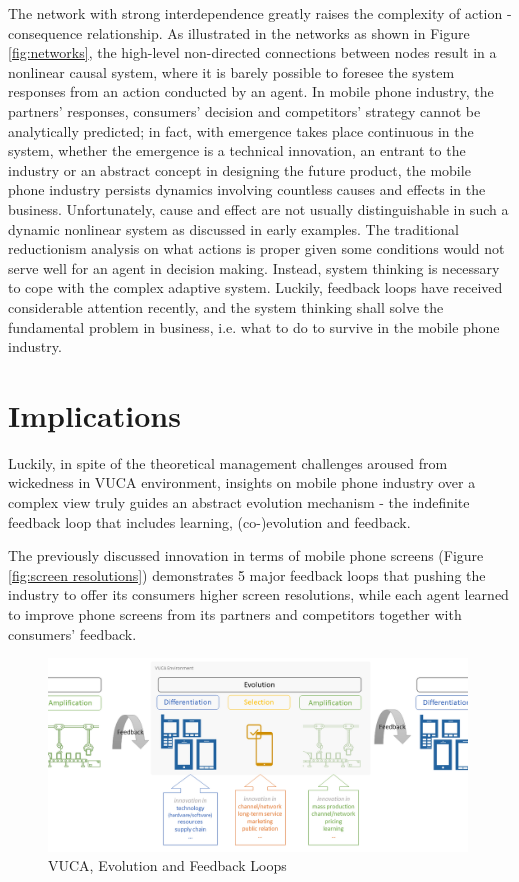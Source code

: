 \documentclass[utf8,english]{gradu3}
\begin{document}
The network with strong interdependence greatly raises the complexity of action - consequence relationship. As illustrated in the networks as shown in Figure \ref{fig:networks}, the high-level non-directed connections between nodes result in a nonlinear causal system, where it is barely possible to foresee the system responses from an action conducted by an agent. In mobile phone industry, the partners' responses, consumers' decision and competitors' strategy cannot be analytically predicted; in fact, with emergence takes place continuous in the system, whether the emergence is a technical innovation, an entrant to the industry or an abstract concept in designing the future product, the mobile phone industry persists dynamics involving countless causes and effects in the business. Unfortunately, cause and effect are not usually distinguishable in such a dynamic nonlinear system as discussed in early examples. The traditional reductionism analysis on what actions is proper given some conditions would not serve well for an agent in decision making. Instead, system thinking is necessary to cope with the complex adaptive system. Luckily, feedback loops have received considerable attention recently, and the system thinking shall solve the fundamental problem in business, i.e. what to do to survive in the mobile phone industry.

\chapter{Implications}

Luckily, in spite of the theoretical management challenges aroused from wickedness in VUCA environment, insights on mobile phone industry over a complex view truly guides an abstract evolution mechanism - the indefinite feedback loop that includes learning, (co-)evolution and feedback. 

The previously discussed innovation in terms of mobile phone screens (Figure \ref{fig:screen resolutions}) demonstrates 5 major feedback loops that pushing the industry to offer its consumers higher screen resolutions, while each agent learned to improve phone screens from its partners and competitors together with consumers' feedback.

\begin{figure}[htb]
    \centering
    \includegraphics[width=0.99\textwidth]{feedback.png}
    \caption{VUCA, Evolution and Feedback Loops}
    \label{fig:feeback loops}
\end{figure}
\end{document}
